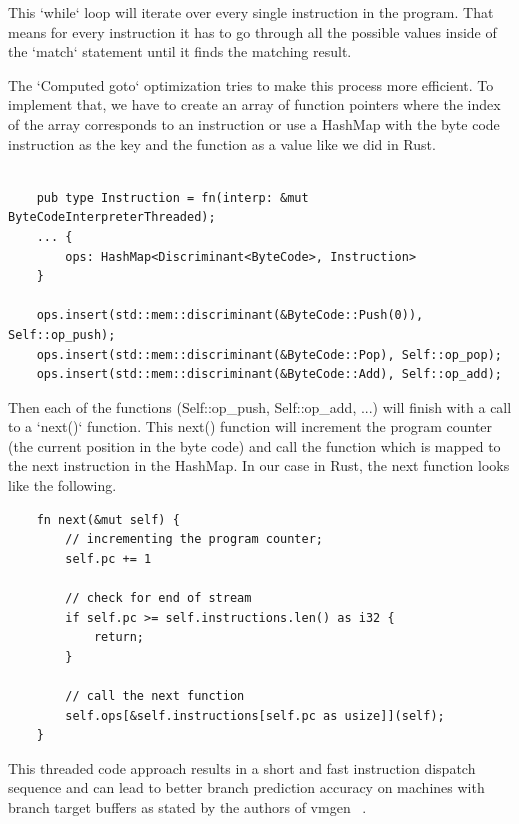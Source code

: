 \documentclass{article}
\begin{document}
\begin{enumerate}
        This `while` loop will iterate over every single instruction in the program. That means
        for every instruction it has to go through all the possible values inside of the `match`
        statement until it finds the matching result.

        The `Computed goto` optimization tries to make this process more efficient.
        To implement that, we have to create an array of function pointers where
        the index of the array corresponds to an instruction or use a HashMap
        with the byte code instruction as the key and the function as a value
        like we did in Rust.

        \begin{verbatim}

    pub type Instruction = fn(interp: &mut ByteCodeInterpreterThreaded);
    ... {
        ops: HashMap<Discriminant<ByteCode>, Instruction>
    }

    ops.insert(std::mem::discriminant(&ByteCode::Push(0)), Self::op_push);
    ops.insert(std::mem::discriminant(&ByteCode::Pop), Self::op_pop);
    ops.insert(std::mem::discriminant(&ByteCode::Add), Self::op_add);
        \end{verbatim}

        Then each of the functions (Self::op\_push, Self::op\_add, ...) will
        finish with a call to a `next()` function. This next() function will
        increment the program counter (the current position in the byte code)
        and call the function which is mapped to the next instruction in the
        HashMap. In our case in Rust, the next function looks like the
        following.

        \begin{verbatim}
    fn next(&mut self) {
        // incrementing the program counter;
        self.pc += 1 

        // check for end of stream
        if self.pc >= self.instructions.len() as i32 {
            return; 
        }

        // call the next function
        self.ops[&self.instructions[self.pc as usize]](self);
    }
        \end{verbatim}

        This threaded code approach results in a short and fast instruction
        dispatch sequence and can lead to better branch prediction accuracy on
        machines with branch target buffers as stated by the authors of vmgen ~\cite{vmgen}.

\end{enumerate}
\end{document}
